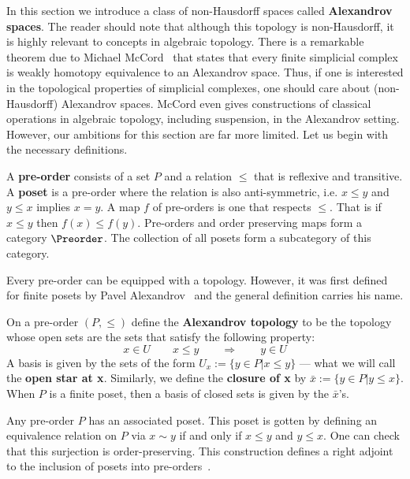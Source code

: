 In this section we introduce a class of non-Hausdorff spaces called \textbf{Alexandrov spaces}. The reader should note that although this topology is non-Hausdorff, it is highly relevant to concepts in algebraic topology. There is a remarkable theorem due to Michael McCord~\cite{mccord-finite} that states that every finite simplicial complex is weakly homotopy equivalence to an Alexandrov space. Thus, if one is interested in the topological properties of simplicial complexes, one should care about (non-Hausdorff) Alexandrov spaces. McCord even gives constructions of classical operations in algebraic topology, including suspension, in the Alexandrov setting. However, our ambitions for this section are far more limited. Let us begin with the necessary definitions.

\begin{defn}
	A \textbf{pre-order} consists of a set $P$ and a relation $\leq$ that is reflexive and transitive. A \textbf{poset} is a pre-order where the relation is also anti-symmetric, i.e. $x\leq y$ and $y\leq x$ implies $x=y$. A map $f$ of pre-orders is one that respects $\leq$. That is if $x\leq y$ then $f(x)\leq f(y)$. Pre-orders and order preserving maps form a category $\Preorder$. The collection of all posets form a subcategory of this category.
\end{defn}

Every pre-order can be equipped with a topology. However, it was first defined for finite posets by Pavel Alexandrov~\cite{alex-dr, alex-ct} and the general definition carries his name.

\begin{defn}
	On a pre-order $(P,\leq)$ define the \textbf{Alexandrov topology} to be the topology whose open sets are the sets that satisfy the following property:
	\[
		x\in U \qquad x\leq y \qquad \Rightarrow \qquad y\in U
	\]
	A basis is given by the sets of the form $U_x:=\{y\in P | x\leq y\}$ --- what we will call the \textbf{open star at x}. Similarly, we define the \textbf{closure of x} by $\bar{x}:=\{y\in P | y\leq x\}$. When $P$ is a finite poset, then a basis of closed sets is given by the $\bar{x}$'s.
\end{defn}

Any pre-order $P$ has an associated poset. This poset is gotten by defining an equivalence relation on $P$ via $x\sim y$ if and only if $x\leq y$ and $y\leq x$. One can check that this surjection is order-preserving. This construction defines a right adjoint to the inclusion of posets into pre-orders~\cite{woolf}.

